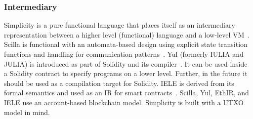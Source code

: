 \subsubsection{Intermediary}
Simplicity is a pure functional language that places itself as an intermediary representation between a higher level (functional) language and a low-level VM~\cite{OConnor2017}. 
Scilla is functional with an automata-based design using explicit state transition functions and handling for communication patterns~\cite{Sergey2018}. 
Yul (formerly IULIA and JULIA) is introduced as part of Solidity and its compiler~\cite{EthereumFoundation2018IULIA}. 
It can be used inside a Solidity contract to specify programs on a lower level. Further, in the future it should be used as a compilation target for Solidity.
IELE is derived from its formal semantics and used as an IR for smart contracts~\cite{Kasampalis2018}. 
Scilla, Yul, EthIR, and IELE use an account-based blockchain model. Simplicity is built with a UTXO model in mind.

